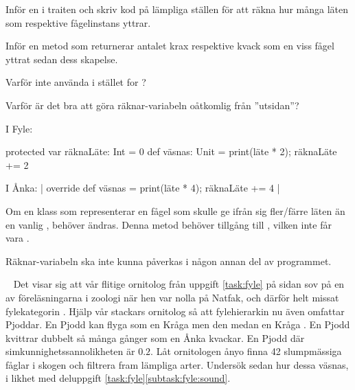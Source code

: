 \Subtask Inför en  i traiten  och skriv kod på lämpliga ställen för att räkna hur många läten som respektive fågelinstans yttrar.

\Subtask Inför en metod  som returnerar antalet krax respektive kvack som en viss fågel yttrat sedan dess skapelse.

\Subtask Varför inte använda  i stället for ?

\Subtask Varför är det bra att göra räknar-variabeln oåtkomlig från ''utsidan''?



\SOLUTION


\TaskSolved \what


\SubtaskSolved  I Fyle:
\begin{Code}
protected var räknaLäte: Int = 0
def väsnas: Unit = { print(läte * 2); räknaLäte += 2 }
\end{Code}

I Ånka: \code| override def väsnas = { print(läte * 4); räknaLäte += 4 }|

\SubtaskSolved  {}

\SubtaskSolved  Om en klass som representerar en fågel som skulle ge ifrån sig fler/färre läten än en vanlig , behöver  ändras. Denna metod behöver tillgång till , vilken inte får vara .

\SubtaskSolved  Räknar-variabeln ska inte kunna påverkas i någon annan del av programmet.


\QUESTEND






\QUESTBEGIN

\Task  \what~ Det visar sig att vår flitige ornitolog från uppgift \ref{task:fyle} på sidan \pageref{task:fyle} sov på en av föreläsningarna i zoologi när hen var nolla på Natfak, och därför helt missat fylekategorin . Hjälp vår stackars ornitolog så att fylehierarkin nu även omfattar Pjoddar. En Pjodd kan flyga som en Kråga men den  medan en Kråga . En Pjodd kvittrar dubbelt så många gånger som en Ånka kvackar. En Pjodd  där simkunnighetssannolikheten är $0.2$. Låt ornitologen ånyo finna 42 slumpmässiga fåglar i skogen och filtrera fram lämpliga arter. Undersök sedan hur dessa väsnas, i likhet med deluppgift \ref{task:fyle}\ref{subtask:fyle:sound}.


